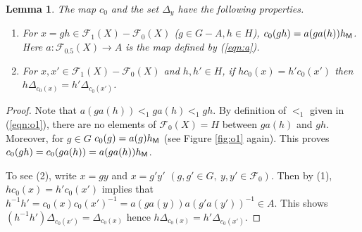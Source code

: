 \documentclass[10pt]{amsart}
\newtheorem{lemma}[theorem]{Lemma}
\numberwithin{equation}{section}
\begin{document}
\begin{lemma}
\label{lemma:c_0}
The map $c_{0}$ and the set $\Delta_{y}$ have the following properties.
\begin{enumerate}
\item For $x = gh \in {\mathcal{F}}_{1}(X)-{\mathcal{F}}_{0}(X)$ ($g \in G-A, h \in H$), $c_{0}(gh)=a(ga(h))h_{\sf M}$. 
Here $a: {\mathcal{F}}_{0.5}(X) \rightarrow A$ is the map defined by (\ref{eqn:a}). 
\item For $x, x' \in {\mathcal{F}}_{1}(X)-{\mathcal{F}}_{0}(X)$ and $h,h' \in H$, if $hc_{0}(x) = h' c_{0}(x')$ then $h\Delta_{c_{0}(x)} = h'\Delta_{c_{0}(x')}$.
\end{enumerate}
\end{lemma}
\begin{proof}
Note that $a(ga(h)) <_{1} ga(h) <_{1} gh$. By definition of $<_{1}$ given in (\ref{eqn:o1}), there are no elements of ${\mathcal{F}}_{0}(X)=H$ between $ga(h)$ and $gh$. Moreover, for $g \in G$ $c_{0}(g) = a(g)h_{\sf M}$ (see Figure \ref{fig:o1} again). This proves $c_{0}(gh) = c_{0}(ga(h))=a(ga(h))h_{\sf M}$. 

To see (2), write $x=gy$ and $x=g'y'$ $(g,g' \in G, \ y,y' \in{\mathcal{F}}_{0})$. Then by (1), $hc_{0}(x)=h'c_{0}(x')$ implies that
$h^{-1}h' = c_{0}(x)c_{0}(x')^{-1} = a(ga(y))a(g'a(y'))^{-1} \in A$.
This shows $(h^{-1}h')\Delta_{c_{0}(x')} = \Delta_{c_{0}(x)}$ hence $h\Delta_{c_{0}(x)} = h'\Delta_{c_{0}(x')}$.
\end{proof}
 
\end{document}
